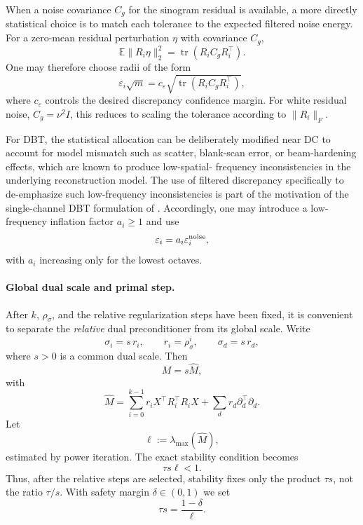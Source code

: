 \documentclass{article}
\begin{document}
When a noise covariance $C_g$ for the sinogram residual is available,
a more directly statistical choice is to match each tolerance to the
expected filtered noise energy.  For a zero-mean residual perturbation
$\eta$ with covariance $C_g$,
\begin{equation}
\label{eq:filtered-noise-energy}
\mathbb E\|R_i\eta\|_2^2
=
\operatorname{tr}(R_iC_gR_i^\top).
\end{equation}
One may therefore choose radii of the form
\begin{equation}
\label{eq:tolerance-noise}
\varepsilon_i\sqrt m
=
c_\varepsilon
\sqrt{\operatorname{tr}(R_iC_gR_i^\top)},
\end{equation}
where $c_\varepsilon$ controls the desired discrepancy confidence
margin.  For white residual noise, $C_g=\nu^2I$, this reduces to
scaling the tolerance according to
$\|R_i\|_F$.

For DBT, the statistical allocation can be deliberately modified near
DC to account for model mismatch such as scatter, blank-scan error, or
beam-hardening effects, which are known to produce low-spatial-
frequency inconsistencies in the underlying reconstruction model.
The use of filtered discrepancy specifically to de-emphasize such
low-frequency inconsistencies is part of the motivation of the
single-channel DBT formulation of \citet{sidky2025accurate}.
Accordingly, one may introduce a low-frequency inflation factor
$a_i\ge1$ and use
\[
\varepsilon_i
=
a_i\varepsilon_i^{\rm noise},
\]
with $a_i$ increasing only for the lowest octaves.

\paragraph{Global dual scale and primal step.}
After $k$, $\rho_\sigma$, and the relative regularization steps have
been fixed, it is convenient to separate the \emph{relative} dual
preconditioner from its global scale.  Write
\begin{equation}
\label{eq:dual-common-scale}
\sigma_i=s\,r_i,
\qquad
r_i=\rho_\sigma^i,
\qquad
\sigma_d=s\,r_d,
\end{equation}
where $s>0$ is a common dual scale.  Then
\[
M=s\widehat M,
\]
with
\begin{equation}
\label{eq:M-ratio}
\widehat M
=
\sum_{i=0}^{k-1}
r_iX^\top R_i^\top R_iX
+
\sum_d
r_d\partial_d^\top\partial_d.
\end{equation}
Let
\[
\ell:=\lambda_{\max}(\widehat M),
\]
estimated by power iteration.  The exact stability condition becomes
\begin{equation}
\label{eq:scale-product}
\tau s\ell<1.
\end{equation}
Thus, after the relative steps are selected, stability fixes only the
product $\tau s$, not the ratio $\tau/s$.  With safety margin
$\delta\in(0,1)$ we set
\begin{equation}
\label{eq:scale-saturation}
\tau s
=
\frac{1-\delta}{\ell}.
\end{equation}
\end{document}
